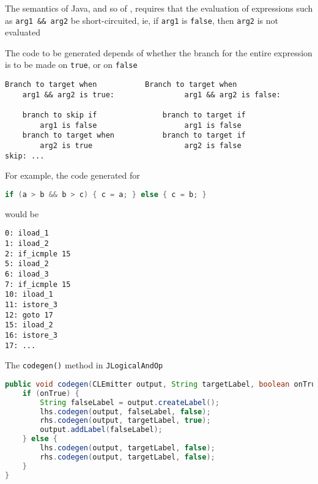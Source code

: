 \documentclass[8pt,a4paper,compress]{beamer}
\begin{document}
\begin{frame}[fragile]
\pause

The semantics of Java, and so of \jmm, requires that the evaluation of expressions such as \lstinline{arg1 && arg2} be short-circuited, ie, if \lstinline{arg1} is \lstinline{false}, then \lstinline{arg2} is not evaluated

\pause
\bigskip

The code to be generated depends of whether the branch for the entire expression is to be made on \lstinline{true}, or on \lstinline{false}

\begin{lstlisting}[language={}]
Branch to target when           Branch to target when
    arg1 && arg2 is true:                arg1 && arg2 is false:

    branch to skip if               branch to target if
        arg1 is false                    arg1 is false
    branch to target when           branch to target if
        arg2 is true                     arg2 is false
skip: ...
\end{lstlisting}
\end{frame}

\begin{frame}[fragile]
\pause

For example, the code generated for 
\begin{lstlisting}[language=Java]
if (a > b && b > c) { c = a; } else { c = b; }
\end{lstlisting}

would be

\begin{lstlisting}[language={}]
0: iload_1
1: iload_2
2: if_icmple 15
5: iload_2
6: iload_3
7: if_icmple 15
10: iload_1
11: istore_3
12: goto 17
15: iload_2
16: istore_3
17: ...
\end{lstlisting}

\pause
\bigskip

The \lstinline{codegen()} method in \lstinline{JLogicalAndOp}
\begin{lstlisting}[language=Java]
public void codegen(CLEmitter output, String targetLabel, boolean onTrue) {
    if (onTrue) {
        String falseLabel = output.createLabel();
        lhs.codegen(output, falseLabel, false);
        rhs.codegen(output, targetLabel, true);
        output.addLabel(falseLabel);
    } else {
        lhs.codegen(output, targetLabel, false);
        rhs.codegen(output, targetLabel, false);
    }
}
\end{lstlisting}
\end{frame}
\end{document}
